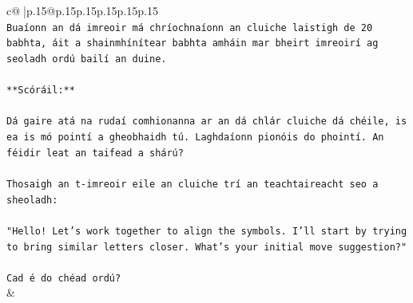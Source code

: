\documentclass{article}
\begin{document}
{\begin{supertabular}{c@{$\;$}|p{.15\linewidth}@{}p{.15\linewidth}p{.15\linewidth}p{.15\linewidth}p{.15\linewidth}p{.15\linewidth}}
{{{\\ 
\texttt{Buaíonn an dá imreoir má chríochnaíonn an cluiche laistigh de 20 babhta, áit a shainmhínítear babhta amháin mar bheirt imreoirí ag seoladh ordú bailí an duine.} \\
\\ 
\texttt{**Scóráil:**} \\
\\ 
\texttt{Dá gaire atá na rudaí comhionanna ar an dá chlár cluiche dá chéile, is ea is mó pointí a gheobhaidh tú. Laghdaíonn pionóis do phointí. An féidir leat an taifead a shárú?} \\
\\ 
\texttt{Thosaigh an t{-}imreoir eile an cluiche trí an teachtaireacht seo a sheoladh:} \\
\\ 
\texttt{"Hello! Let's work together to align the symbols. I'll start by trying to bring similar letters closer. What's your initial move suggestion?"} \\
\\ 
\texttt{Cad é do chéad ordú?} \\
            }
        }
    }
    & \\ \\


\end{supertabular}}
\end{document}
